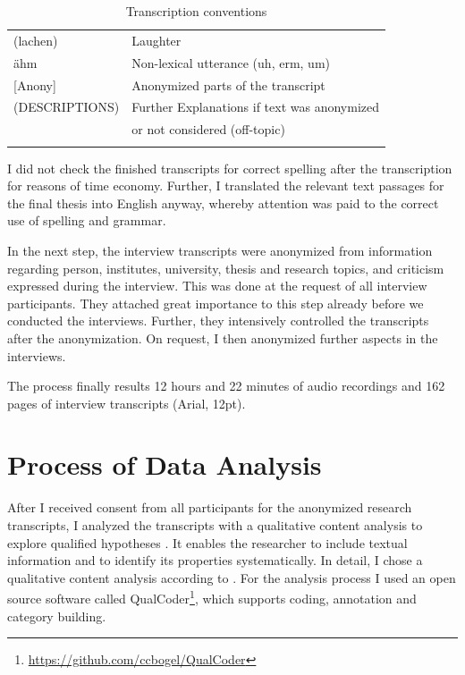 \documentclass[12pt, a4paper, titlepage, oneside, abstract=true, toc=listof, toc=bibliography]{scrreprt}
\begin{document}
\small
\begin{table}
\caption{Transcription conventions}
\centering
\begin{tabular}{ll}
 & \\
\hline
\hline
 	(lachen) & Laughter\\
 	ähm	& Non-lexical utterance (uh, erm, um)\\
 	{[Anony]} & Anonymized parts of the transcript\\
	(DESCRIPTIONS)	& Further Explanations if text was anonymized\\
	               & or not considered (off-topic)\\
\hline
 & \\
\end{tabular}
\end{table}
\normalsize

I did not check the finished transcripts for correct spelling after the transcription for reasons of time economy. Further, I translated the relevant text passages for the final thesis into English anyway, whereby attention was paid to the correct use of spelling and grammar.

In the next step, the interview transcripts were anonymized from information regarding person, institutes, university, thesis and research topics, and criticism expressed during the interview. This was done at the request of all interview participants. They attached great importance to this step already before we conducted the interviews. Further, they intensively controlled the transcripts after the anonymization. On request, I then anonymized further aspects in the interviews.

The process finally results 12 hours and 22 minutes of audio recordings and 162 pages of interview transcripts (Arial, 12pt). 

\section{Process of Data Analysis}
After I received consent from all participants for the anonymized research transcripts, I analyzed the transcripts with a qualitative content analysis to explore qualified hypotheses \citep{Kohlbacher2006, Krippendorff2012, Mayring2000, Mayring2014}. It enables the researcher to include textual information and to identify its properties systematically. In detail, I chose a qualitative content analysis according to \citet{Mayring2014}. For the analysis process I used an open source software called QualCoder\footnote{\url{https://github.com/ccbogel/QualCoder}}, which supports coding, annotation and category building. 
\end{document}
